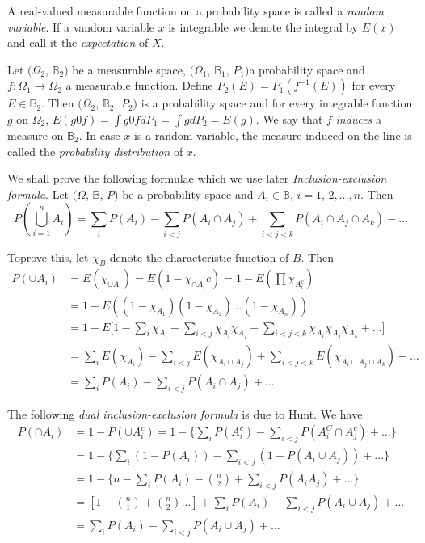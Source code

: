 A real-valued measurable function on a probability space is called a
\textit{random variable}. If a vandom variable $x$ is integrable we
denote the integral by $E(x)$ and call it the \textit{expectation}
of $X$. 
 
Let $(\Omega_2$, $ \mathbb{B}_2)$ be a measurable space, $(\Omega_1$,
$ \mathbb{B}_1 $, $ P_1)$a probability space and $f: \Omega_1 \to
\Omega_2$ a measurable function. Define $P_2(E) = P_1(f^{-1}(E))$ for
every $E \in \mathbb{B}_2$. Then $(\Omega_2$, $ \mathbb{B}_2$, $P_2)$
is a probability space and for every integrable function $g$ on
$\Omega_2$,  $E(g 0 f)= \int g 0 f d P_1 = \int gdP_2 = E(g)$. We say
that $f$ \textit{induces} a measure on $\mathbb{B}_2$. In case $x$
is a random variable, the measure induced on the line is called the
\textit{probability distribution} of $x$. 
 
We shall prove the following formulae which we use later 
\textit{Inclusion-exclusion formula}. Let $(\Omega $, $ \mathbb{B}$, $ P)$
be a probability space and $A_i \in \mathbb{B}$, $ i= 1$, $2,\ldots,
n$. Then  
$$
P\left(\bigcup^n_{i=1} A_i\right) = \sum_i P(A_i) - \sum_{i < j} P(A_i \cap A_j)
+ \sum_{i < j < k} P(A_i \cap A_j \cap A_k)- \ldots 
$$

To\pageoriginale prove this, let $\chi_B$ denote the characteristic
function of $B$. 
Then
\begin{align*}
  P(\cup A_i) & = E(\chi_{\cup A_i}) = E(1- \chi_{\cap A_i}c) =
  1-E \left(\prod \chi_{A_i^c}\right)\\ 
  & = 1-E(( 1-\chi_{A_1}) (1-\chi_{A_2}) \ldots (1- \chi_{A_n}))\\
  & = 1-E \bigg[1- \sum_i \chi_{A_i} + \sum_{i < j} \chi_{A_i}
    \chi_{A_j}- \sum_{i < j<k} \chi_{A_i} \chi_{A_j} \chi_{A_k}+
    \ldots \bigg]\\ 
  & = \sum_i E(\chi_{A_i}) - \sum_{i < j} E(\chi_{A_i \cap A_j}) +
  \sum_{i < j < k} E(\chi_{A_i \cap A_j \cap A_k})- \ldots\\ 
  & = \sum_i P(A_i) - \sum_{i < j} P(A_i \cap A_j) + \ldots
\end{align*} 

The following \textit{dual inclusion-exclusion formula} is due to
Hunt. We have  
\begin{align*}
  P(\cap A_i) & = 1- P(\cup A^c_i) = 1- \bigg\{ \sum_i P(A^c_i) -
  \sum_{i < j} P(A^C_i \cap A^c_j) + \ldots \bigg\}\\ 
  & = 1- \bigg\{ \sum_i (1-P(A_i)) - \sum_{i < j}(1-P(A_i \cup A_j)) +
  \ldots \bigg\}\\ 
  & = 1- \bigg\{ n - \sum_i P(A_i) - \binom{n}{2} + \sum_{i < j} P(A_i
  A_j) + \ldots \bigg\}\\ 
  & = \left[ 1- \binom{n}{1} + \binom{n}{2} \ldots \right] + \sum_i
  P(A_i) - \sum_{i < j} P(A_i \cup A_j) + \ldots \\ 
  &= \sum_i P(A_i) - \sum_{i < j} P(A_i \cup A_j)+ \ldots
\end{align*}


